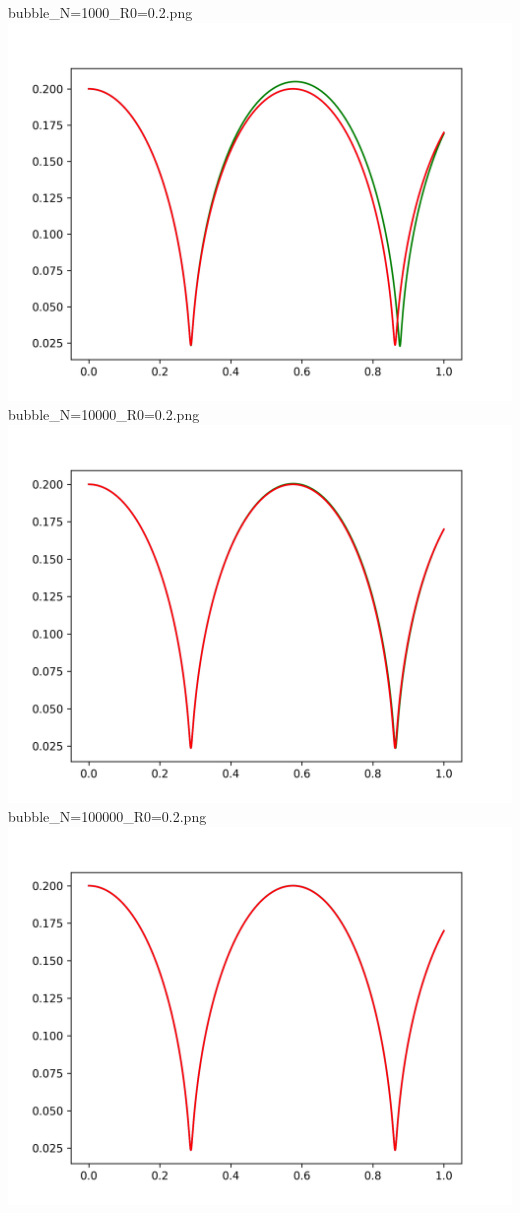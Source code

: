 \documentclass[a4paper,14pt]{article}
\begin{document}
bubble\_N=1000\_R0=0.2.png\newline
\includegraphics[scale=0.5]{images/graphs/bubble_N=10000_R0=0.2.png}\newline
bubble\_N=10000\_R0=0.2.png\newline
\includegraphics[scale=0.5]{images/graphs/bubble_N=100000_R0=0.2.png}\newline
bubble\_N=100000\_R0=0.2.png\newline
\includegraphics[scale=0.5]{images/graphs/bubble_N=600000_R0=0.2.png}\newline
\end{document}
